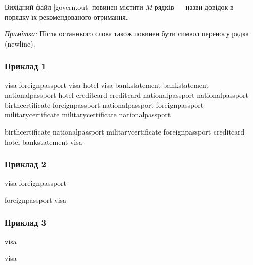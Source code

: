\documentclass[12pt,a4paper]{article}
\begin{document}
Вихідний файл |govern.out| повинен містити \(M\) рядків --- назви довідок в порядку їх рекомендованого отримання.

\emph{Примітка:} Після останнього слова також повинен бути символ переносу рядка (newline).


\pagebreak


\subsubsection*{Приклад 1}

\textbf{}

\begin{codeblock}
visa foreignpassport
visa hotel
visa bankstatement
bankstatement nationalpassport
hotel creditcard
creditcard nationalpassport
nationalpassport birthcertificate
foreignpassport nationalpassport
foreignpassport militarycertificate
militarycertificate nationalpassport
\end{codeblock}

\textbf{}

\begin{codeblock}
birthcertificate
nationalpassport
militarycertificate
foreignpassport
creditcard
hotel
bankstatement
visa
\end{codeblock}


\subsubsection*{Приклад 2}

\textbf{}

\begin{codeblock}
visa foreignpassport
\end{codeblock}

\textbf{}

\begin{codeblock}
foreignpassport
visa
\end{codeblock}


\subsubsection*{Приклад 3}

\textbf{}

\begin{codeblock}
visa
\end{codeblock}

\textbf{}

\begin{codeblock}
visa
\end{codeblock}
\end{document}
